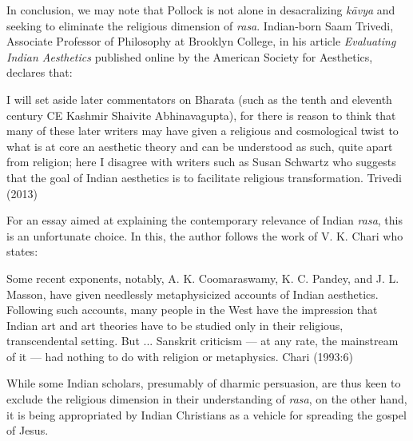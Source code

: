 In conclusion, we may note that Pollock is not alone in desacralizing \textsl{kāvya} and seeking to eliminate the religious dimension of \textsl{rasa}. Indian-born Saam Trivedi, Associate Professor of Philosophy at Brooklyn College, in his article \textsl{Evaluating Indian Aesthetics} published online by the American Society for Aesthetics, declares that:

\begin{myquote}
I will set aside later commentators on Bharata (such as the tenth and eleventh century CE Kashmir Shaivite Abhinavagupta), for there is reason to think that many of these later writers may have given a religious and cosmological twist to what is at core an aesthetic theory and can be understood as such, quite apart from religion; here I disagree with writers such as Susan Schwartz who suggests that the goal of Indian aesthetics is to facilitate religious transformation. 
\hfill Trivedi (2013)
\end{myquote}

For an essay aimed at explaining the contemporary relevance of Indian \textsl{rasa}, this is an unfortunate choice. In this, the author follows the work of V. K. Chari who states:

\begin{myquote}
Some recent exponents, notably, A. K. Coomaraswamy, K. C. Pandey, and J. L. Masson, have given needlessly metaphysicized accounts of Indian aesthetics. Following such accounts, many people in the West have the impression that Indian art and art theories have to be studied only in their religious, transcendental setting. But ... Sanskrit criticism --- at any rate, the mainstream of it --- had nothing to do with religion or metaphysics. 
\hfill Chari (1993:6)
\end{myquote}

While some Indian scholars, presumably of dharmic persuasion, are thus keen to exclude the religious dimension in their understanding of \textsl{rasa}, on the other hand, it is being appropriated by Indian Christians as a vehicle for spreading the gospel of Jesus. 

